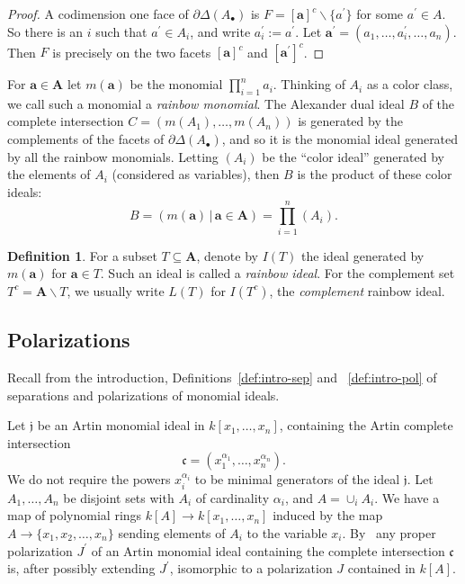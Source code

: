 \documentclass[10pt,a4paper]{article}
\theoremstyle{definition}
\newtheorem{defi}[cdrthm]{Definition}
\theoremstyle{remark}
\theoremstyle{plain}
\newcommand{\vardel}{\partial}
\newcommand{\sus}{\subseteq}
\newcommand{\pil}{\rightarrow}
\newcommand{\bfa}{{\mathbf a}}
\newcommand{\ic}{{\mathfrak c}}
\newcommand{\ijfr}{{\mathfrak j}}
\newcommand{\Ab}{A_\bullet}
\newcommand{\bfA}{{\mathbf A}}
\newcommand{\al}{{\alpha}}
\newcommand{\Delst}{\vardel \Delta}
\begin{document}
\begin{proof} A codimension one face of $\Delst(\Ab)$ is
  $F = [\bfa]^c \backslash \{a^\prime \}$ for some $a^\prime \in A$.
  So there is an $i$ such that $a^\prime \in A_i$, and write $a_i^\prime
:= a^\prime$. Let $\bfa^\prime = (a_1, \ldots, a_i^\prime, \ldots, a_n)$.
  Then $F$ is precisely on the two facets $[\bfa]^c$ and $[\bfa^\prime]^c$.
\end{proof}


For $\bfa \in \bfA$ let $m(\bfa)$ be the monomial 
$\prod_{i = 1}^n a_i$. Thinking
of $A_i$ as a color class, we call such a monomial a {\it rainbow
monomial}.  The Alexander dual ideal $B$ of the complete intersection
$C = (m(A_1), \ldots, m(A_n))$ is generated by the complements
of the facets of $\Delst(\Ab)$, and so it is the monomial
ideal generated by all the  rainbow monomials. Letting
$(A_i)$ be the ``color ideal'' generated by the elements of $A_i$ (considered
as variables), then $B$ is the product of these color ideals:
\[ B  = (m(\bfa) \, | \, \bfa \in \bfA) = \prod_{i = 1}^n(A_i). \]

\begin{defi}
For a subset $T \sus \bfA$, denote by $I(T)$ the ideal generated
by $m(\bfa)$ for $\bfa \in T$. Such an ideal is called a {\it rainbow ideal}.
For the complement set $T^c = \bfA \backslash T$, we
usually write $L(T)$ for $I(T^c)$, the {\it complement} rainbow ideal.
\end{defi}

\setcounter{subsection}{2}\setcounter{cdrthm}{5}

  \subsection{Polarizations}
  \label{subsec:pol}

  Recall from the introduction, Definitions~\ref{def:intro-sep} and
 ~\ref{def:intro-pol} of separations and polarizations of monomial ideals.

  Let $\ijfr$ be an Artin monomial ideal
  in $k[x_1, \ldots, x_n]$, containing the Artin complete
  intersection
  \[ \ic = (x_1^{\al_1}, \ldots, x_n^{\al_n}). \]
  We do not require the powers $x_i^{\alpha_i}$ 
  to be minimal generators of the ideal $\ijfr$. 
  Let $A_1, \ldots, A_n$ be disjoint sets with $A_i$ of cardinality $\alpha_i$,
  and $A = \cup_i A_i$.
We have a map of polynomial rings
  $k[A] \pil k[x_1, \ldots, x_n]$ induced by the map 
  $A \pil \{x_1,x_2, \ldots, x_n \}$ sending elements of $A_i$
  to the variable $x_i$.
  By~\cite[Remark 2.5]{AFL} any proper polarization $J^\prime$
  of an Artin monomial ideal
  containing the complete intersection $\ic$ is, after possibly
  extending $J^\prime$, isomorphic to a polarization $J$ contained in $k[A]$. 
  
\end{document}
